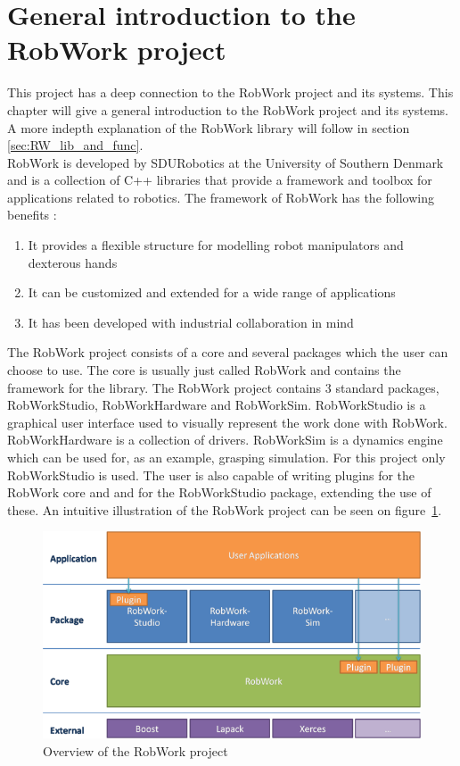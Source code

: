 \section{General introduction to the RobWork project}
This project has a deep connection to the RobWork project and its systems. This chapter will give a general introduction to the RobWork project and its systems. A more indepth explanation of the RobWork library will follow in section \ref{sec:RW_lib_and_func}.\\

RobWork is developed by SDURobotics at the University of Southern Denmark and is a collection of C++ libraries \cite{RW_Webpage} that provide a framework and toolbox for applications related to robotics. The framework of RobWork has the following benefits \cite{RW_Toolbox_Framework}:

\begin{enumerate}
	\item It provides a flexible structure for modelling robot manipulators and dexterous hands
	\item It can be customized and extended for a wide range of applications
	\item It has been developed with industrial collaboration in mind
\end{enumerate}

The RobWork project consists of a core and several packages which the user can choose to use. The core is usually just called RobWork and contains the framework for the library. The RobWork project contains 3 standard packages, RobWorkStudio, RobWorkHardware and RobWorkSim. RobWorkStudio is a graphical user interface used to visually represent the work done with RobWork. RobWorkHardware is a collection of drivers. RobWorkSim is a dynamics engine which can be used for, as an example, grasping simulation. For this project only RobWorkStudio is used. The user is also capable of writing plugins for the RobWork core and and for the RobWorkStudio package, extending the use of these. An intuitive illustration of the RobWork project can be seen on figure~\ref{fig:RWOverview}.

\begin{figure}[h]
	\centering
	\includegraphics[scale=1]{Figures/RWOverview.png}
	\caption{Overview of the RobWork project \cite{RW_Overview}}
	\label{fig:RWOverview}
\end{figure}